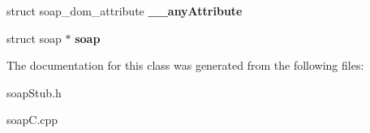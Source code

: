 \begin{DoxyCompactItemize}
\item 
\hypertarget{classpass____item__USCOREdata_afe3bf30f0c5a3eabf5809ba0429b704c}{
struct soap\_\-dom\_\-attribute {\bfseries \_\-\_\-anyAttribute}}
\label{classpass____item__USCOREdata_afe3bf30f0c5a3eabf5809ba0429b704c}

\item 
\hypertarget{classpass____item__USCOREdata_aab3b8d2df62401a4ae1bdb87563e080f}{
struct soap $\ast$ {\bfseries soap}}
\label{classpass____item__USCOREdata_aab3b8d2df62401a4ae1bdb87563e080f}

\end{DoxyCompactItemize}


The documentation for this class was generated from the following files:\begin{DoxyCompactItemize}
\item 
soapStub.h\item 
soapC.cpp\end{DoxyCompactItemize}
